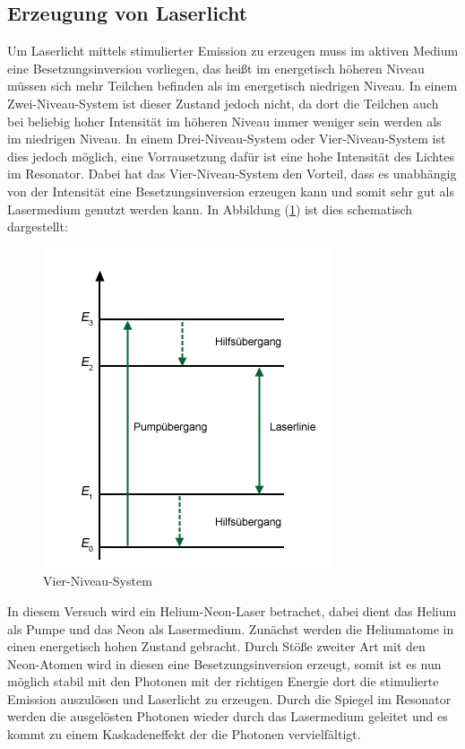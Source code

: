 \subsection{Erzeugung von Laserlicht}
Um Laserlicht mittels stimulierter Emission zu erzeugen muss im aktiven Medium eine Besetzungsinversion vorliegen, das heißt im energetisch höheren Niveau müssen sich mehr Teilchen befinden als im energetisch niedrigen Niveau. In einem
Zwei-Niveau-System ist dieser Zustand jedoch nicht, da dort die Teilchen auch bei beliebig hoher Intensität im höheren Niveau immer weniger sein werden als im niedrigen Niveau. In einem Drei-Niveau-System oder Vier-Niveau-System ist dies jedoch möglich, eine Vorrausetzung dafür ist eine hohe Intensität des Lichtes im Resonator. Dabei hat das Vier-Niveau-System den Vorteil, dass es unabhängig von der Intensität eine Besetzungsinversion erzeugen kann und somit sehr gut als Lasermedium genutzt werden kann. In Abbildung (\ref{fig:4niveau}) ist dies schematisch dargestellt:
\begin{figure}[h!]
  \centering
  \includegraphics[scale=0.5]{fig/4niveau.jpg}
  \caption{Vier-Niveau-System \cite{Anleitung4}}
  \label{fig:4niveau}
\end{figure}
\FloatBarrier
In diesem Versuch wird ein Helium-Neon-Laser betrachet, dabei dient das Helium als Pumpe und das Neon als Lasermedium. Zunächst werden die Heliumatome in einen energetisch hohen Zustand gebracht. Durch Stöße zweiter Art mit den Neon-Atomen wird in diesen eine Besetzungsinversion erzeugt, somit ist es nun möglich stabil mit den Photonen mit der richtigen Energie dort die stimulierte Emission auszulösen und Laserlicht zu erzeugen. Durch die Spiegel im Resonator werden die ausgelösten Photonen wieder durch das Lasermedium geleitet und es kommt zu einem Kaskadeneffekt der die Photonen vervielfältigt.
